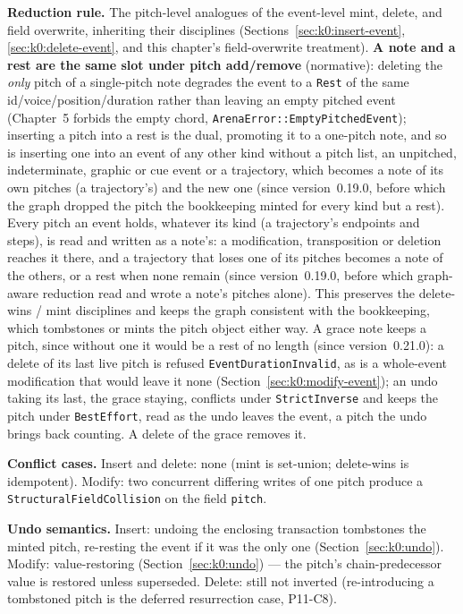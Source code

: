 \documentclass[11pt,letterpaper]{report}
\begin{document}
\textbf{Reduction rule.} The pitch-level analogues of the event-level mint,
delete, and field overwrite, inheriting their disciplines
(Sections~\ref{sec:k0:insert-event}, \ref{sec:k0:delete-event}, and this
chapter's field-overwrite treatment). \textbf{A note and a rest are the same slot
under pitch add/remove} (normative): deleting the \emph{only} pitch of a
single-pitch note degrades the event to a \texttt{Rest} of the same
id/voice/position/duration rather than leaving an empty pitched event (Chapter~5
forbids the empty chord, \texttt{ArenaError::EmptyPitchedEvent}); inserting a
pitch into a rest is the dual, promoting it to a one-pitch note, and so is
inserting one into an event of any other kind without a pitch list, an
unpitched, indeterminate, graphic or cue event or a trajectory, which becomes a
note of its own pitches (a trajectory's) and the new one (since
version~0.19.0, before which the graph dropped the pitch the bookkeeping minted
for every kind but a rest). Every pitch an event holds, whatever its kind (a
trajectory's endpoints and steps), is read and written as a note's: a
modification, transposition or deletion reaches it there, and a trajectory
that loses one of its pitches becomes a note of the others, or a rest when
none remain (since version~0.19.0, before which graph-aware reduction read and
wrote a note's pitches alone). This preserves
the delete-wins / mint disciplines and keeps the graph consistent with the
bookkeeping, which tombstones or mints the pitch object either way. A grace
note keeps a pitch, since without one it would be a rest of no length (since
version~0.21.0): a delete of its last live pitch is refused
\texttt{EventDurationInvalid}, as is a whole-event modification that would
leave it none (Section~\ref{sec:k0:modify-event}); an undo taking its last,
the grace staying, conflicts under \texttt{StrictInverse} and keeps the pitch
under \texttt{BestEffort}, read as the undo leaves the event, a pitch the
undo brings back counting. A delete of the grace removes it.

\textbf{Conflict cases.} Insert and delete: none (mint is set-union; delete-wins
is idempotent). Modify: two concurrent differing writes of one pitch produce a
\texttt{StructuralFieldCollision} on the field \texttt{pitch}.

\textbf{Undo semantics.} Insert: undoing the enclosing transaction tombstones
the minted pitch, re-resting the event if it was the only one
(Section~\ref{sec:k0:undo}). Modify: value-restoring
(Section~\ref{sec:k0:undo}) --- the pitch's chain-predecessor value is
restored unless superseded. Delete: still not inverted (re-introducing a
tombstoned pitch is the deferred resurrection case, P11-C8).
\end{document}
